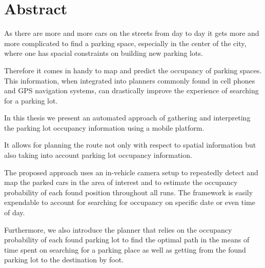 \chapter*{Abstract}
\label{cha:abstract}

As there are more and more cars on the streets from day to day it gets more and
more complicated to find a parking space, especially in the center of the city,
where one has spacial constraints on building new parking lots.

Therefore it comes in handy to map and predict the occupancy of parking spaces.
This information, when integrated into planners commonly found in cell phones
and GPS navigation systems, can drastically improve the experience of searching
for a parking lot.

In this thesis we present an automated approach of gathering and interpreting
the parking lot occupancy information using a mobile platform.

It allows for planning the route not only
with respect to spatial information but also taking into account parking lot
occupancy information.

The proposed approach uses an in-vehicle camera setup to repeatedly detect and map the parked cars in the area of interest
and to estimate the occupancy probability of each found position throughout all runs. The framework
is easily expendable to account for searching for occupancy on specific date or
even time of day.

Furthermore, we also introduce the planner that relies on the occupancy
probability of each found parking lot to find the optimal path in the means of time spent on
searching for a parking place as well as getting from the found parking lot to the destination by foot.



